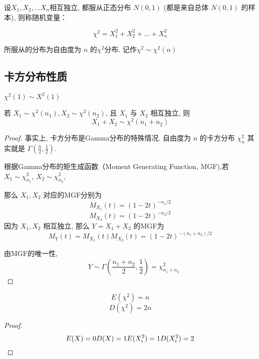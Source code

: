 \begin{definition}[卡方分布]
    设$X_1,X_2,...X_n$相互独立, 都服从正态分布 $N(0,1)$ (都是来自总体 $N(0,1)$ 的样本), 则称随机变量：

    $$
        \chi^2 = X_1^2 + X_2^2 + ... + X_n^2
    $$

    所服从的分布为自由度为 $n$ 的$\chi^2$分布. 记作$\chi^2 \sim \chi^2(n)$
\end{definition}

\subsection{卡方分布性质}

\begin{corollary}
    $\chi^2(1) \sim X^2(1)$
\end{corollary}

\begin{corollary}
    若 $ X_{1} \sim \chi^{2}\left(n_{1}\right), X_{2} \sim \chi^{2}\left(n_{2}\right) $, 且 $ X_{1} $ 与 $ X_{2} $ 相互独立, 则
    $$
        X_{1}+X_{2} \sim \chi^{2}\left(n_{1}+n_{2}\right)
    $$
\end{corollary}

\begin{proof}
    事实上, 卡方分布是Gamma分布的特殊情况. 自由度为 $ n $ 的卡方分布 $ \chi_{n}^{2} $ 其实就是 $ \Gamma\left(\frac{n}{2}, \frac{1}{2}\right) $.

    根据Gamma分布的矩生成函数（Moment Generating Function, MGF),若$ X_{1} \sim \chi_{n_{1}}^{2} $, $ X_{2} \sim \chi_{n_{2}}^{2} $,

    那么 $ X_{1}, X_{2} $ 对应的MGF分别为
    $$ M_{X_{1}}(t)=(1-2 t)^{-n_{1} / 2} $$
    $$ M_{X_{2}}(t)=(1-2 t)^{-n_{2} / 2} $$
    因为 $ X_{1}, X_{2} $ 相互独立, 那么 $ Y=X_{1}+X_{2} $ 的MGF为
    $$ M_{Y}(t)=M_{X_{1}}(t) M_{X_{2}}(t)=(1-2 t)^{-\left(n_{1}+n_{2}\right) / 2} $$

    由MGF的唯一性,
    $$ \quad Y \sim \Gamma\left(\frac{n_{1}+n_{2}}{2}, \frac{1}{2}\right)=\chi_{n_{1}+n_{2}}^{2} $$
\end{proof}

\begin{corollary}
    $$E(\chi^2) = n$$
    $$D(\chi^2) = 2n$$
\end{corollary}

\begin{proof}
    $$
        E(X) = 0\\
        D(X) = 1\\
        E(X_i^2) = 1\\
        D(X_i^2) = 2
    $$
\end{proof}

